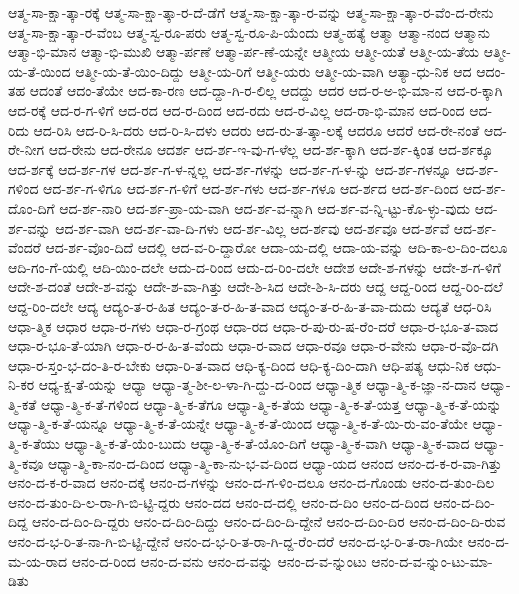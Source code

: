 {ಆತ್ಮ-ಸಾ-ಕ್ಷಾ-ತ್ಕಾ-ರಕ್ಕೆ
ಆತ್ಮ-ಸಾ-ಕ್ಷಾ-ತ್ಕಾ-ರ-ದೆ-ಡೆಗೆ
ಆತ್ಮ-ಸಾ-ಕ್ಷಾ-ತ್ಕಾ-ರ-ವನ್ನು
ಆತ್ಮ-ಸಾ-ಕ್ಷಾ-ತ್ಕಾ-ರ-ವೆಂ-ದ-ರೇನು
ಆತ್ಮ-ಸಾ-ಕ್ಷಾ-ತ್ಕಾ-ರ-ವೆಂಬ
ಆತ್ಮ-ಸ್ವ-ರೂ-ಪರು
ಆತ್ಮ-ಸ್ವ-ರೂ-ಪಿ-ಯೆಂದು
ಆತ್ಮ-ಹತ್ಯೆ
ಆತ್ಮಾ
ಆತ್ಮಾ-ನಂದ
ಆತ್ಮಾನು
ಆತ್ಮಾ-ಭಿ-ಮಾನ
ಆತ್ಮಾ-ಭಿ-ಮುಖಿ
ಆತ್ಮಾ-ರ್ಪಣೆ
ಆತ್ಮಾ-ರ್ಪ-ಣೆ-ಯನ್ನೇ
ಆತ್ಮೀಯ
ಆತ್ಮೀ-ಯತೆ
ಆತ್ಮೀ-ಯ-ತೆಯ
ಆತ್ಮೀ-ಯ-ತೆ-ಯಿಂದ
ಆತ್ಮೀ-ಯ-ತೆ-ಯಿಂ-ದಿದ್ದು
ಆತ್ಮೀ-ಯ-ರಿಗೆ
ಆತ್ಮೀ-ಯರು
ಆತ್ಮೀ-ಯ-ವಾಗಿ
ಆತ್ಯಾ-ಧು-ನಿಕ
ಆದ
ಆದಂ-ತಹ
ಆದಂತೆ
ಆದಂ-ತೆಯೇ
ಆದ-ಕಾ-ರಣ
ಆದ-ದ್ದಾ-ಗಿ-ರ-ಲಿಲ್ಲ
ಆದದ್ದು
ಆದರ
ಆದ-ರ-ಅ-ಭಿ-ಮಾ-ನ
ಆದ-ರ-ಕ್ಕಾಗಿ
ಆದ-ರಕ್ಕೆ
ಆದ-ರ-ಗ-ಳಿಗೆ
ಆದ-ರದ
ಆದ-ರ-ದಿಂದ
ಆದ-ರದು
ಆದ-ರ-ವಿಲ್ಲ
ಆದ-ರಾ-ಭಿ-ಮಾನ
ಆದ-ರಿಂದ
ಆದ-ರಿದು
ಆದ-ರಿಸಿ
ಆದ-ರಿ-ಸಿ-ದರು
ಆದ-ರಿ-ಸಿ-ದಳು
ಆದರು
ಆದ-ರು-ತ-ತ್ಕಾ-ಲಕ್ಕೆ
ಆದರೂ
ಆದರೆ
ಆದ-ರೇ-ನಂತೆ
ಆದ-ರೇ-ನೀಗ
ಆದ-ರೇನು
ಆದ-ರೇನೂ
ಆದರ್ಶ
ಆದ-ರ್ಶ-ಇ-ವು-ಗ-ಳೆಲ್ಲ
ಆದ-ರ್ಶ-ಕ್ಕಾಗಿ
ಆದ-ರ್ಶ-ಕ್ಕಿಂತ
ಆದ-ರ್ಶಕ್ಕೂ
ಆದ-ರ್ಶಕ್ಕೆ
ಆದ-ರ್ಶ-ಗಳ
ಆದ-ರ್ಶ-ಗ-ಳ-ನ್ನಲ್ಲ
ಆದ-ರ್ಶ-ಗಳನ್ನು
ಆದ-ರ್ಶ-ಗ-ಳ-ನ್ನು
ಆದ-ರ್ಶ-ಗಳನ್ನೂ
ಆದ-ರ್ಶ-ಗಳಿಂದ
ಆದ-ರ್ಶ-ಗ-ಳಿಗೂ
ಆದ-ರ್ಶ-ಗ-ಳಿಗೆ
ಆದ-ರ್ಶ-ಗಳು
ಆದ-ರ್ಶ-ಗಳೂ
ಆದ-ರ್ಶದ
ಆದ-ರ್ಶ-ದಿಂದ
ಆದ-ರ್ಶ-ದೊಂ-ದಿಗೆ
ಆದ-ರ್ಶ-ನಾರಿ
ಆದ-ರ್ಶ-ಪ್ರಾ-ಯ-ವಾಗಿ
ಆದ-ರ್ಶ-ವ-ನ್ನಾಗಿ
ಆದ-ರ್ಶ-ವ-ನ್ನಿ-ಟ್ಟು-ಕೊ-ಳ್ಳು-ವುದು
ಆದ-ರ್ಶ-ವನ್ನು
ಆದ-ರ್ಶ-ವಾಗಿ
ಆದ-ರ್ಶ-ವಾ-ದಿ-ಗಳು
ಆದ-ರ್ಶ-ವಿಲ್ಲ
ಆದ-ರ್ಶವು
ಆದ-ರ್ಶವೂ
ಆದ-ರ್ಶವೆ
ಆದ-ರ್ಶ-ವೆಂದರೆ
ಆದ-ರ್ಶ-ವೊಂ-ದಿದೆ
ಆದಲ್ಲಿ
ಆದ-ವ-ರಿ-ದ್ದಾರೋ
ಆದಾ-ಯ-ದಲ್ಲಿ
ಆದಾ-ಯ-ವನ್ನು
ಆದಿ-ಕಾ-ಲ-ದಿಂ-ದಲೂ
ಆದಿ-ಗಂ-ಗೆ-ಯಲ್ಲಿ
ಆದಿ-ಯಿಂ-ದಲೇ
ಆದು-ದ-ರಿಂದ
ಆದು-ದ-ರಿಂ-ದಲೇ
ಆದೇಶ
ಆದೇ-ಶ-ಗಳನ್ನು
ಆದೇ-ಶ-ಗ-ಳಿಗೆ
ಆದೇ-ಶ-ದಂತೆ
ಆದೇ-ಶ-ವನ್ನು
ಆದೇ-ಶ-ವಾ-ಗಿತ್ತು
ಆದೇ-ಶಿ-ಸಿದ
ಆದೇ-ಶಿ-ಸಿ-ದರು
ಆದ್ದ
ಆದ್ದ-ರಿಂದ
ಆದ್ದ-ರಿಂ-ದಲೆ
ಆದ್ದ-ರಿಂ-ದಲೇ
ಆದ್ಯ
ಆದ್ಯಂ-ತ-ರ-ಹಿತ
ಆದ್ಯಂ-ತ-ರ-ಹಿ-ತ-ವಾದ
ಆದ್ಯಂ-ತ-ರ-ಹಿ-ತ-ವಾ-ದುದು
ಆದ್ಯತೆ
ಆಧ-ರಿಸಿ
ಆಧಾ-ತ್ಮಿಕ
ಆಧಾರ
ಆಧಾ-ರ-ಗಳು
ಆಧಾ-ರ-ಗ್ರಂಥ
ಆಧಾ-ರದ
ಆಧಾ-ರ-ಪು-ರು-ಷ-ರೆಂ-ದರೆ
ಆಧಾ-ರ-ಭೂ-ತ-ವಾದ
ಆಧಾ-ರ-ಭೂ-ತೆ-ಯಾಗಿ
ಆಧಾ-ರ-ರ-ಹಿ-ತ-ವೆಂದು
ಆಧಾ-ರ-ವಾದ
ಆಧಾ-ರವೂ
ಆಧಾ-ರ-ವೇನು
ಆಧಾ-ರ-ವೊ-ದಗಿ
ಆಧಾ-ರ-ಸ್ತಂ-ಭ-ದಂ-ತಿ-ರ-ಬೇಕು
ಆಧಾ-ರಿ-ತ-ವಾದ
ಆಧಿ-ಕ್ಯ-ದಿಂದ
ಆಧಿ-ಕ್ಯ-ದಿಂ-ದಾಗಿ
ಆಧಿ-ಪತ್ಯ
ಆಧು-ನಿಕ
ಆಧು-ನಿ-ಕರ
ಆಧ್ಯ-ಕ್ಷ-ತೆ-ಯನ್ನು
ಆಧ್ಯಾ
ಆಧ್ಯಾ-ತ್ಮ-ಶೀ-ಲ-ಳಾ-ಗಿ-ದ್ದು-ದ-ರಿಂದ
ಆಧ್ಯಾ-ತ್ಮಿಕ
ಆಧ್ಯಾ-ತ್ಮಿ-ಕ-ಜ್ಞಾ-ನ-ದಾನ
ಆಧ್ಯಾ-ತ್ಮಿ-ಕತೆ
ಆಧ್ಯಾ-ತ್ಮಿ-ಕ-ತೆ-ಗಳಿಂದ
ಆಧ್ಯಾ-ತ್ಮಿ-ಕ-ತೆಗೂ
ಆಧ್ಯಾ-ತ್ಮಿ-ಕ-ತೆಯ
ಆಧ್ಯಾ-ತ್ಮಿ-ಕ-ತೆ-ಯತ್ತ
ಆಧ್ಯಾ-ತ್ಮಿ-ಕ-ತೆ-ಯನ್ನು
ಆಧ್ಯಾ-ತ್ಮಿ-ಕ-ತೆ-ಯನ್ನೂ
ಆಧ್ಯಾ-ತ್ಮಿ-ಕ-ತೆ-ಯನ್ನೇ
ಆಧ್ಯಾ-ತ್ಮಿ-ಕ-ತೆ-ಯಿಂದ
ಆಧ್ಯಾ-ತ್ಮಿ-ಕ-ತೆ-ಯಿ-ರು-ವಂ-ತೆಯೇ
ಆಧ್ಯಾ-ತ್ಮಿ-ಕ-ತೆಯು
ಆಧ್ಯಾ-ತ್ಮಿ-ಕ-ತೆ-ಯೆಂ-ಬುದು
ಆಧ್ಯಾ-ತ್ಮಿ-ಕ-ತೆ-ಯೊಂ-ದಿಗೆ
ಆಧ್ಯಾ-ತ್ಮಿ-ಕ-ವಾಗಿ
ಆಧ್ಯಾ-ತ್ಮಿ-ಕ-ವಾದ
ಆಧ್ಯಾ-ತ್ಮಿ-ಕವೂ
ಆಧ್ಯಾ-ತ್ಮಿ-ಕಾ-ನಂ-ದ-ದಿಂದ
ಆಧ್ಯಾ-ತ್ಮಿ-ಕಾ-ನು-ಭ-ವ-ದಿಂದ
ಆಧ್ಯಾ-ಯದ
ಆನಂದ
ಆನಂ-ದ-ಕ-ರ-ವಾ-ಗಿತ್ತು
ಆನಂ-ದ-ಕ-ರ-ವಾದ
ಆನಂ-ದಕ್ಕೆ
ಆನಂ-ದ-ಗಳನ್ನು
ಆನಂ-ದ-ಗ-ಳಿಂ-ದಲೂ
ಆನಂ-ದ-ಗೊಂಡು
ಆನಂ-ದ-ತುಂ-ದಿಲ
ಆನಂ-ದ-ತುಂ-ದಿ-ಲ-ರಾ-ಗಿ-ಬಿ-ಟ್ಟಿ-ದ್ದರು
ಆನಂ-ದದ
ಆನಂ-ದ-ದಲ್ಲಿ
ಆನಂ-ದ-ದಿಂ
ಆನಂ-ದ-ದಿಂದ
ಆನಂ-ದ-ದಿಂ-ದಿದ್ದ
ಆನಂ-ದ-ದಿಂ-ದಿ-ದ್ದರು
ಆನಂ-ದ-ದಿಂ-ದಿದ್ದು
ಆನಂ-ದ-ದಿಂ-ದಿ-ದ್ದೇನೆ
ಆನಂ-ದ-ದಿಂ-ದಿರ
ಆನಂ-ದ-ದಿಂ-ದಿ-ರುವ
ಆನಂ-ದ-ಭ-ರಿ-ತ-ನಾ-ಗಿ-ಬಿ-ಟ್ಟಿ-ದ್ದೇನೆ
ಆನಂ-ದ-ಭ-ರಿ-ತ-ರಾ-ಗಿ-ದ್ದ-ರೆಂ-ದರೆ
ಆನಂ-ದ-ಭ-ರಿ-ತ-ರಾ-ಗಿಯೇ
ಆನಂ-ದ-ಮ-ಯ-ರಾದ
ಆನಂ-ದ-ರಿಂದ
ಆನಂ-ದ-ವನು
ಆನಂ-ದ-ವನ್ನು
ಆನಂ-ದ-ವ-ನ್ನುಂಟು
ಆನಂ-ದ-ವ-ನ್ನುಂ-ಟು-ಮಾ-ಡಿತು
}
